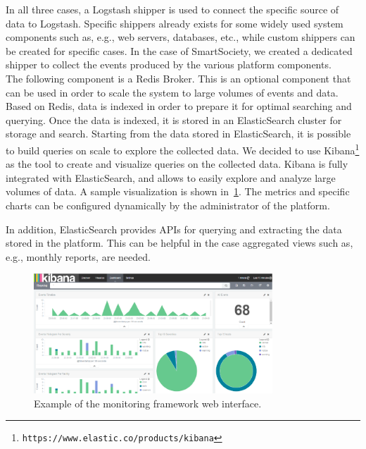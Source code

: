 In all three cases, a Logstash shipper is used to connect the specific source of data to Logstash. Specific shippers already exists for some widely used system components such as, e.g., web servers, databases, etc., while custom shippers can be created for specific cases. In the case of SmartSociety, we created a dedicated shipper to collect the events produced by the various platform components.\\
The following component is a Redis Broker. This is an optional component that can be used in order to scale the system to large volumes of events and data. Based on Redis, data is indexed in order to prepare it for optimal searching and querying. Once the data is indexed, it is stored in an ElasticSearch cluster for storage and search. 
Starting from the data stored in ElasticSearch, it is possible to build queries on scale to explore the collected data. We decided to use Kibana\footnote{{\tt https://www.elastic.co/products/kibana}} as the tool to create and visualize queries on the collected data. Kibana is fully integrated with ElasticSearch, and allows to easily explore and analyze large volumes of data. A sample visualization is shown in~\ref{fig:kibana}.  The metrics and specific charts can be configured dynamically by the administrator of the platform.

In addition, ElasticSearch provides APIs for querying and extracting the data stored in the platform. This can be helpful in the case aggregated views such as, e.g., monthly reports, are needed.

\begin{figure}[!hbt]
\centering
\includegraphics[width=0.8\textwidth]{figs/kibana.pdf}
\caption{Example of the monitoring framework web interface.}
\label{fig:kibana}
\end{figure}
